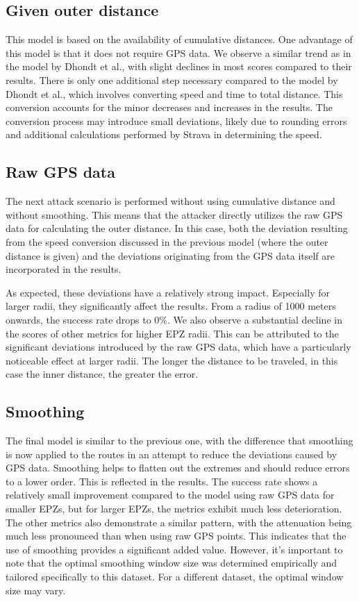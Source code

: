 \documentclass[conference]{IEEEtran}
\begin{document}
\subsection{Given outer distance}
This model is based on the availability of cumulative distances. One advantage
of this model is that it does not require GPS data. We observe a similar trend
as in the model by Dhondt et al., with slight declines in most scores compared
to their results. There is only one additional step necessary compared to the
model by Dhondt et al., which involves converting speed and time to total
distance. This conversion accounts for the minor decreases and increases in the
results. The conversion process may introduce small deviations, likely due to
rounding errors and additional calculations performed by Strava in determining
the speed.

\subsection{Raw GPS data}

The next attack scenario is performed without using cumulative distance and
without smoothing. This means that the attacker directly utilizes the raw GPS
data for calculating the outer distance. In this case, both the deviation
resulting from the speed conversion discussed in the previous model (where the
outer distance is given) and the deviations originating from the GPS data
itself are incorporated in the results.

As expected, these deviations have a relatively strong impact. Especially for
larger radii, they significantly affect the results. From a radius of 1000
meters onwards, the success rate drops to 0\%. We also observe a substantial
decline in the scores of other metrics for higher EPZ radii. This can be
attributed to the significant deviations introduced by the raw GPS data, which
have a particularly noticeable effect at larger radii. The longer the distance
to be traveled, in this case the inner distance, the greater the error.

\subsection{Smoothing}
The final model is similar to the previous one, with the difference that
smoothing is now applied to the routes in an attempt to reduce the deviations
caused by GPS data. Smoothing helps to flatten out the extremes and should
reduce errors to a lower order. This is reflected in the results. The success
rate shows a relatively small improvement compared to the model using raw GPS
data for smaller EPZs, but for larger EPZs, the metrics exhibit much less
deterioration. The other metrics also demonstrate a similar pattern, with the
attenuation being much less pronounced than when using raw GPS points. This
indicates that the use of smoothing provides a significant added value.
However, it's important to note that the optimal smoothing window size was
determined empirically and tailored specifically to this dataset. For a
different dataset, the optimal window size may vary.
\end{document}
